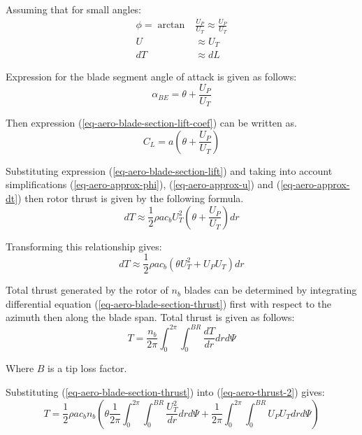 Assuming that for small angles:
\begin{align}
  \label{eq-aero-approx-phi}
  \phi = \arctan &\frac{U_P}{U_T} \approx \frac{U_P}{U_T} \\
  \label{eq-aero-approx-u}
  U  &\approx U_T \\
  \label{eq-aero-approx-dt}
  dT &\approx dL
\end{align}

Expression for the blade segment angle of attack is given as follows:
\begin{equation}
  \alpha_{BE} = \theta + \frac{U_P}{U_T}
\end{equation}

Then expression (\ref{eq-aero-blade-section-lift-coef}) can be written as. \cite{GessowMyers1985}
\begin{equation}
  \label{eq-aero-rotor-list-coef}
  C_L = a \left( \theta + \frac{U_P}{U_T} \right)
\end{equation}

Substituting expression (\ref{eq-aero-blade-section-lift}) and taking into account simplifications (\ref{eq-aero-approx-phi}), (\ref{eq-aero-approx-u}) and (\ref{eq-aero-approx-dt}) then rotor thrust is given by the following formula.
\begin{equation}
  dT
  \approx
  \frac{1}{2} \rho a c_b U_T^2 \left( \theta + \frac{U_P}{U_T} \right) dr
\end{equation}

Transforming this relationship gives:
\begin{equation}
  \label{eq-aero-blade-section-thrust}
  dT
  \approx
  \frac{1}{2} \rho a c_b
  \left( \theta U_T^2 + U_P U_T \right) dr
\end{equation}

Total thrust generated by the rotor of $n_b$ blades can be determined by integrating differential equation (\ref{eq-aero-blade-section-thrust}) first with respect to the azimuth then along the blade span. \cite{GessowMyers1985} Total thrust is given as follows:
\begin{equation}
  \label{eq-aero-thrust-2}
  T = \frac{ n_b }{ 2 \pi } \int_{0}^{2 \pi} \int_{0}^{BR}
  \frac{dT}{dr} dr d\Psi
\end{equation}

Where $B$ is a tip loss factor.

Substituting (\ref{eq-aero-blade-section-thrust}) into (\ref{eq-aero-thrust-2}) gives:
\begin{equation}
  T = \frac{1}{2} \rho a c_b n_b
  \left(
  \theta \frac{1}{2 \pi}
  \int_{0}^{2\pi} \int_{0}^{BR} \frac{U_T^2}{dr} dr d\Psi
  +
  \frac{1}{2\pi} \int_{0}^{2\pi} \int_{0}^{BR} U_P U_T dr d\Psi
  \right)
\end{equation}

